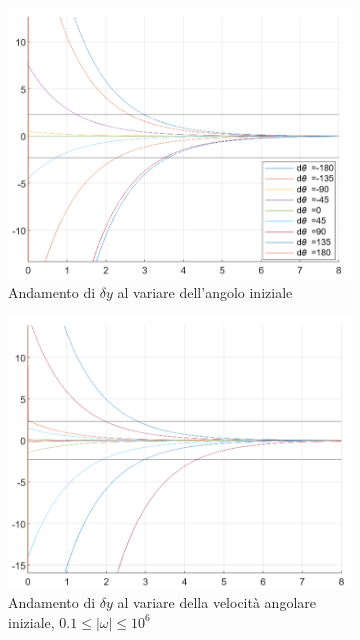 \documentclass[a4paper, 11pt]{article}
\begin{document}
\begin{figure}[h!]
	\centering
	\begin{subfigure}[b]{0.4\textwidth}
		\centering
		\includegraphics[width=\textwidth]{./images/theta_iniziali.png}
		\caption{Andamento di $\delta y$ al variare dell'angolo iniziale}
		\label{fig:theta_iniziali}
	\end{subfigure}
	\begin{subfigure}[b]{0.4\textwidth}
		\centering
		\includegraphics[width=\textwidth]{./images/omega_iniziali.png}
		\caption{Andamento di $\delta y$ al variare della velocità angolare iniziale, $0.1 \le \lvert\omega\rvert \le 10^6$}
		\label{fig:omega_iniziali}
	\end{subfigure}
	
	\caption{}
	\label{fig:stato_iniziale}
\end{figure}
\end{document}
